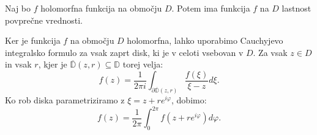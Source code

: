 \documentclass[mat1]{fmfdelo}
\begin{document}
    \begin{trditev}
        Naj bo $f$ holomorfna funkcija na območju $D$. Potem ima funkcija $f$ na $D$ lastnost povprečne vrednosti.
    \end{trditev}
    \begin{dokaz}
        Ker je funkcija $f$ na območju $D$ holomorfna, lahko uporabimo Cauchyjevo integralsko formulo za vsak zaprt disk, ki je v celoti vsebovan v $D$. Za vsak $z \in D$ in vsak $r$, kjer je $\overline{\mathbb{D}}(z,r) \subseteq \mathbb{D}$ torej velja:
        $$
        f(z) = \frac{1}{2 \pi i} \int_{\partial \overline{\mathbb{D}}(z, r)}{\frac{f(\xi)}{\xi  - z}}d\xi.
        $$
        Ko rob diska parametriziramo z $\xi = z + r e^{i \varphi}$, dobimo:
        $$
        f(z) = \frac{1}{2 \pi} \int_{0}^{2\pi}{f(z + re^{i\varphi})}d\varphi.
        $$
    \end{dokaz}
\end{document}
